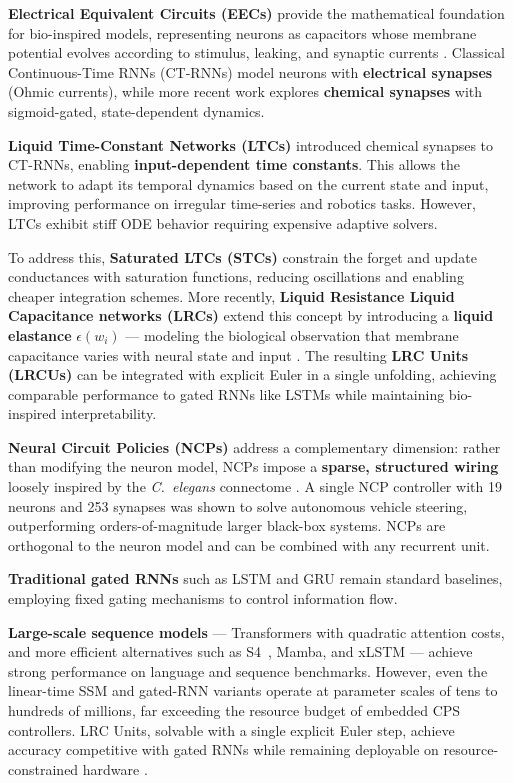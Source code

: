 \documentclass[11pt,a4paper]{article}
\begin{document}
\textbf{Electrical Equivalent Circuits (EECs)} provide the mathematical foundation for bio-inspired models, representing neurons as capacitors whose membrane potential evolves according to stimulus, leaking, and synaptic currents \cite{Kandel2000, Wicks1996}. Classical Continuous-Time RNNs (CT-RNNs) model neurons with \textbf{electrical synapses} (Ohmic currents), while more recent work explores \textbf{chemical synapses} with sigmoid-gated, state-dependent dynamics.

\textbf{Liquid Time-Constant Networks (LTCs)} \cite{Hasani2020} introduced chemical synapses to CT-RNNs, enabling \textbf{input-dependent time constants}. This allows the network to adapt its temporal dynamics based on the current state and input, improving performance on irregular time-series and robotics tasks. However, LTCs exhibit stiff ODE behavior requiring expensive adaptive solvers.

To address this, \textbf{Saturated LTCs (STCs)} \cite{Farsang2024chemical} constrain the forget and update conductances with saturation functions, reducing oscillations and enabling cheaper integration schemes. More recently, \textbf{Liquid Resistance Liquid Capacitance networks (LRCs)} \cite{Farsang2024liquid} extend this concept by introducing a \textbf{liquid elastance} $\epsilon(w_i)$ — modeling the biological observation that membrane capacitance varies with neural state and input \cite{Howell2015, Severin2024, Kumar2023}. The resulting \textbf{LRC Units (LRCUs)} can be integrated with explicit Euler in a single unfolding, achieving comparable performance to gated RNNs like LSTMs while maintaining bio-inspired interpretability.

\textbf{Neural Circuit Policies (NCPs)} \cite{Lechner_Hasani_Amini_Henzinger_Rus_Grosu_2020} address a complementary dimension: rather than modifying the neuron model, NCPs impose a \textbf{sparse, structured wiring} loosely inspired by the \textit{C.~elegans} connectome \cite{Wicks1996}. A single NCP controller with 19 neurons and 253 synapses was shown to solve autonomous vehicle steering, outperforming orders-of-magnitude larger black-box systems. NCPs are orthogonal to the neuron model and can be combined with any recurrent unit.

\textbf{Traditional gated RNNs} such as LSTM \cite{Hochreiter1997} and GRU \cite{Cho2014} remain standard baselines, employing fixed gating mechanisms to control information flow.

\textbf{Large-scale sequence models} --- Transformers with quadratic attention costs, and more efficient alternatives such as S4~\cite{gu2021efficiently}, Mamba, and xLSTM --- achieve strong performance on language and sequence benchmarks. However, even the linear-time SSM and gated-RNN variants operate at parameter scales of tens to hundreds of millions, far exceeding the resource budget of embedded CPS controllers. LRC Units, solvable with a single explicit Euler step, achieve accuracy competitive with gated RNNs while remaining deployable on resource-constrained hardware \cite{Farsang2024liquid}.
\end{document}
